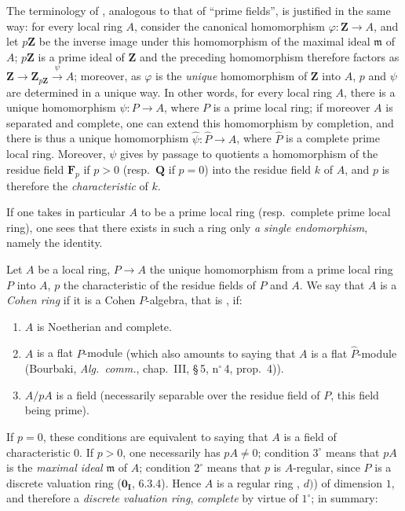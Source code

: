 The terminology of , analogous to that of ``prime fields'', is justified in the same way: for every local ring $A$, consider the canonical homomorphism $\varphi:\mathbf{Z}\to A$, and let $p\mathbf{Z}$ be the inverse image under this homomorphism of the maximal ideal $\mathfrak{m}$ of $A$; $p\mathbf{Z}$ is a prime ideal of $\mathbf{Z}$ and the preceding homomorphism therefore factors as $\mathbf{Z}\to\mathbf{Z}_{p\mathbf{Z}}\xrightarrow{\psi}A$; moreover, as $\varphi$ is the \emph{unique} homomorphism of $\mathbf{Z}$ into $A$, $p$ and $\psi$ are determined in a unique way.
In other words, for every local ring $A$, there is a unique homomorphism $\psi:P\to A$, where $P$ is a prime local ring; if moreover $A$ is separated and complete, one can extend this homomorphism by completion, and there is thus a unique homomorphism $\hat{\psi}:\widehat{P}\to A$, where $\widehat{P}$ is a complete prime local ring.
Moreover, $\psi$ gives by passage to quotients a homomorphism of the residue field $\mathbf{F}_p$ if $p>0$ (resp.\ $\mathbf{Q}$ if $p=0$) into the residue field $k$ of $A$, and $p$ is therefore the \emph{characteristic} of $k$.

If one takes in particular $A$ to be a prime local ring (resp.\ complete prime local ring), one sees that there exists in such a ring only \emph{a single endomorphism}, namely the identity.

\begin{definition}[19.8.4]
\label{0.19.8.4}
Let $A$ be a local ring, $P\to A$ the unique homomorphism from a prime local ring $P$ into $A$, $p$ the characteristic of the residue fields of $P$ and $A$.
We say that $A$ is a \emph{Cohen ring} if it is a Cohen $P$-algebra, that is , if:
\begin{enumerate}
  \item[$1^\circ$] $A$ is Noetherian and complete.
  \item[$2^\circ$] $A$ is a flat $P$-module \textup{(which also amounts to saying that $A$ is a flat $\widehat{P}$-module (Bourbaki, \emph{Alg.\ comm.}, chap.~III, \S\,5, n$^\circ$\,4, prop.~4))}.
  \item[$3^\circ$] $A/pA$ is a field \textup{(necessarily separable over the residue field of $P$, this field being prime)}.
\end{enumerate}
\end{definition}

If $p=0$, these conditions are equivalent to saying that $A$ is a field of characteristic $0$.
If $p>0$, one necessarily has $pA\neq 0$; condition $3^\circ$ means that $pA$ is the \emph{maximal ideal} $\mathfrak{m}$ of $A$; condition $2^\circ$ means that $p$ is $A$-regular, since $P$ is a discrete valuation ring ($\mathbf{0_I}$, 6.3.4).
Hence $A$ is a regular ring , $d)$) of dimension $1$, and therefore a \emph{discrete valuation ring}, \emph{complete} by virtue of $1^\circ$; in summary:

